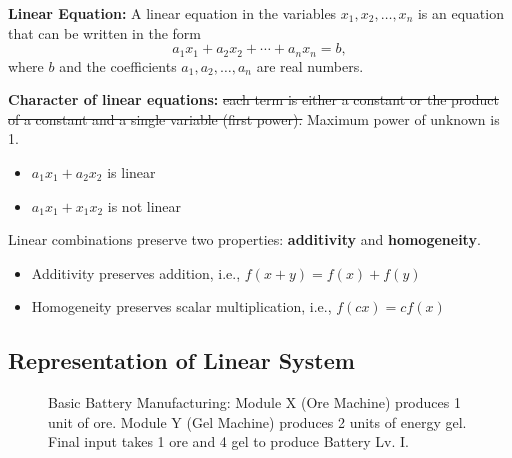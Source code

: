 \documentclass[11pt]{article}
\theoremstyle{definition}
\begin{document}
\textbf{Linear Equation:} A linear equation in the variables $x_1, x_2, \ldots, x_n$ is an equation that can be written in the form
\[
    a_1x_1 + a_2x_2 + \cdots + a_nx_n = b,
\]
where $b$ and the coefficients $a_1, a_2, \ldots, a_n$ are real numbers.

\textbf{Character of linear equations:} \sout{each term is either a constant or the product of a constant and a single variable (first power).} Maximum power of unknown is 1.
\begin{itemize}
    \item $a_1x_1 + a_2x_2$ is linear
    \item $a_1x_1 + x_1x_2$ is not linear
\end{itemize}

Linear combinations preserve two properties: \textbf{additivity} and \textbf{homogeneity}.

\begin{itemize}
    \item Additivity preserves addition, i.e., $f(x+y) = f(x) + f(y)$
    \item Homogeneity preserves scalar multiplication, i.e., $f(cx) = cf(x)$
\end{itemize}



\subsection{Representation of Linear System}

\begin{figure}[H]
\centering
{}
\caption{Basic Battery Manufacturing: Module X (Ore Machine) produces 1 unit of ore. Module Y (Gel Machine) produces 2 units of energy gel. Final input takes 1 ore and 4 gel to produce Battery Lv. I.}
\label{fig:linear_system_schematic}

\end{figure}
\end{document}
